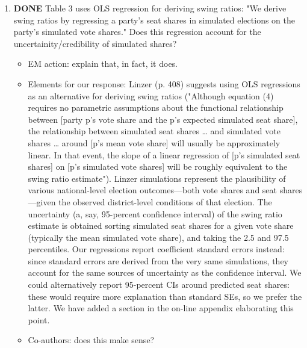 \documentclass{article}
\begin{document}
\begin{enumerate}
\begin{itemize}
\end{itemize}
\item {\bfseries\sffamily DONE} Table 3 uses OLS regression for deriving swing ratios: "We derive swing ratios by regressing a party's seat shares in simulated elections on the party's simulated vote shares." Does this regression account for the uncertainity/credibility of simulated shares?
\label{sec:orgheadline29}
\begin{itemize}
\item EM action: explain that, in fact, it does.
\item Elements for our response: Linzer (p. 408) suggests using OLS regressions as an alternative for deriving swing ratios ("Although equation (4) requires no parametric assumptions about the functional relationship between [party p's vote share and the p's expected simulated seat share], the relationship between simulated seat shares \ldots{} and simulated vote shares \ldots{} around [p's mean vote share] will usually be approximately linear. In that event, the slope of a linear regression of [p's simulated seat shares] on [p's simulated vote shares] will be roughly equivalent to the swing ratio estimate"). Linzer simulations represent the plausibility of various national-level election outcomes---both vote shares and seat shares---given the observed district-level conditions of that election. The uncertainty (a, say, 95-percent confidence interval) of the swing ratio estimate is obtained sorting simulated seat shares for a given vote share (typically the mean simulated vote share), and taking the 2.5 and 97.5 percentiles. Our regressions report coefficient standard errors instead: since standard errors are derived from the very same simulations, they account for  the same sources of uncertainty as the confidence interval. We could alternatively report 95-percent CIs around predicted seat shares: these would require more explanation than standard SEs, so we prefer the latter. We have added a section in the on-line appendix elaborating this point.
\item Co-authors: does this make sense?
\end{itemize}
\end{enumerate}
\end{document}
